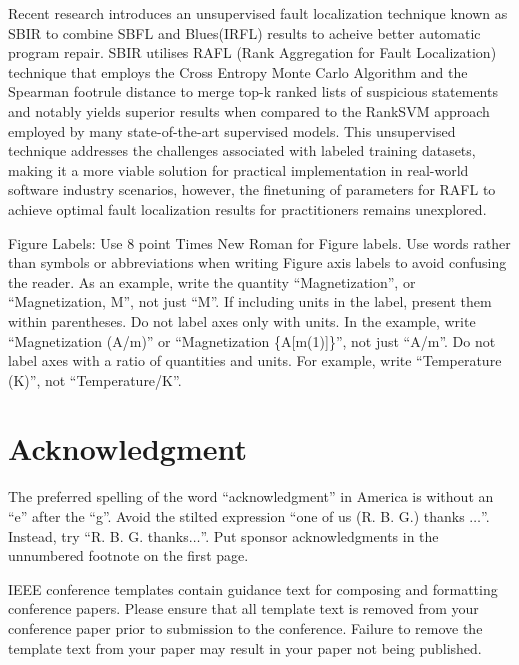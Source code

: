\documentclass[10pt,conference]{IEEEtran}
\begin{document}
	Recent research introduces an unsupervised fault localization technique known as SBIR \cite{motwani2023better} to combine SBFL and Blues(IRFL) results to acheive better automatic program repair. SBIR utilises RAFL (Rank Aggregation for Fault Localization) technique that employs the Cross Entropy Monte Carlo Algorithm and the Spearman footrule distance to merge top-k ranked lists of suspicious statements and notably yields superior results when compared to the RankSVM approach employed by many state-of-the-art supervised models. This unsupervised technique addresses the challenges associated with labeled training datasets, making it a more viable solution for practical implementation in real-world software industry scenarios, however, the finetuning of parameters for RAFL to achieve optimal fault localization results for practitioners remains unexplored.
	
	
	Figure Labels: Use 8 point Times New Roman for Figure labels. Use words 
	rather than symbols or abbreviations when writing Figure axis labels to 
	avoid confusing the reader. As an example, write the quantity 
	``Magnetization'', or ``Magnetization, M'', not just ``M''. If including 
	units in the label, present them within parentheses. Do not label axes only 
	with units. In the example, write ``Magnetization (A/m)'' or ``Magnetization 
	\{A[m(1)]\}'', not just ``A/m''. Do not label axes with a ratio of 
	quantities and units. For example, write ``Temperature (K)'', not 
	``Temperature/K''.
	
	\section*{Acknowledgment}
	
	The preferred spelling of the word ``acknowledgment'' in America is without 
	an ``e'' after the ``g''. Avoid the stilted expression ``one of us (R. B. 
	G.) thanks $\ldots$''. Instead, try ``R. B. G. thanks$\ldots$''. Put sponsor 
	acknowledgments in the unnumbered footnote on the first page.
	
	
	  
	
	\vspace{12pt}
	\color{red}
	IEEE conference templates contain guidance text for composing and formatting conference papers. Please ensure that all template text is removed from your conference paper prior to submission to the conference. Failure to remove the template text from your paper may result in your paper not being published.
	
\end{document}
